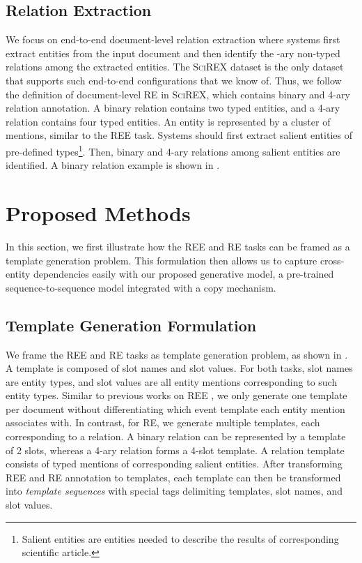 \documentclass[11pt]{article}
\begin{document}
\subsection{Relation Extraction} We focus on end-to-end document-level relation extraction where systems first extract entities from the input document and then identify the -ary non-typed relations among the extracted entities. The \textsc{SciREX} \cite{jain-etal-2020-scirex} dataset is the only dataset that supports such end-to-end configurations that we know of. Thus, we follow the definition of document-level RE in \textsc{SciREX}, which contains binary and 4-ary relation annotation. A binary relation contains two typed entities, and a 4-ary relation contains four typed entities. An entity is represented by a cluster of mentions, similar to the REE task. Systems should first extract salient entities of pre-defined types\footnote{Salient entities are entities needed to describe the results of corresponding scientific article.}. Then, binary and 4-ary relations among salient entities are identified. A binary relation example is shown in .
%
 \section{Proposed Methods}
In this section, we first illustrate how the REE and RE tasks can be framed as a template generation problem. This formulation then allows us to capture cross-entity dependencies easily with our proposed generative model, a pre-trained sequence-to-sequence model integrated with a copy mechanism.

\subsection{Template Generation Formulation}
\label{sec:ie_as_tempgen}
We frame the REE and RE tasks as template generation problem, as shown in . A template is composed of slot names and slot values. For both tasks, slot names are entity types, and slot values are all entity mentions corresponding to such entity types. Similar to previous works on REE \cite{huang-riloff-2011-peeling, du-cardie-2020-document, du-2020-grit}, we only generate one template per document without differentiating which event template each entity mention associates with. In contrast, for RE, we generate multiple templates, each corresponding to a relation. A binary relation can be represented by a template of 2 slots, whereas a 4-ary relation forms a 4-slot template. A relation template consists of typed mentions of corresponding salient entities. After transforming REE and RE annotation to templates, each template can then be transformed into \textit{template sequences} with special tags delimiting templates, slot names, and slot values. 
\end{document}
